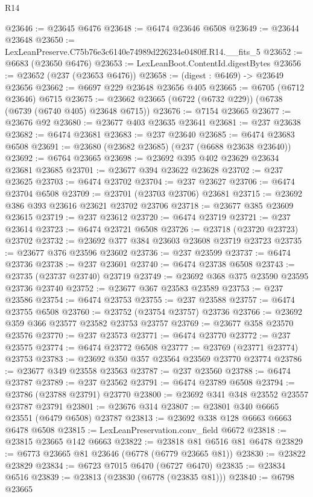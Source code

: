 \begin{lexlean}{R14}
\begin{coremodule}
@23646 := @23645 @6476
@23648 := @6474 @23646 @6508
@23649 := @23644 @23648
@23650 := LexLeanPreserve.C75b76e3c6140e74989d226234e0480ff.R14.__fits_5
@23652 := @6683 (@23650 @6476)
@23653 := LexLeanBoot.ContentId.digestBytes
@23656 := @23652 (@237 (@23653 @6476))
@23658 := (digest : @6469) -> @23649 @23656
@23662 := @6697 @229 @23648 @23656 @405
@23665 := @6705 (@6712 @23646) @6715
@23675 := @23662 @23665 (@6722 (@6732 @229)) (@6738 (@6739 (@6740 @405) @23648 @6715))
@23676 := @7154 @23665
@23677 := @23676 @92
@23680 := @23677 @403 @23635 @23641
@23681 := @237 @23638
@23682 := @6474 @23681
@23683 := @237 @23640
@23685 := @6474 @23683 @6508
@23691 := @23680 (@23682 @23685) (@237 (@6688 @23638 @23640))
@23692 := @6764 @23665
@23698 := @23692 @395 @402 @23629 @23634 @23681 @23685
@23701 := @23677 @394 @23622 @23628
@23702 := @237 @23625
@23703 := @6474 @23702
@23704 := @237 @23627
@23706 := @6474 @23704 @6508
@23709 := @23701 (@23703 @23706) @23681
@23715 := @23692 @386 @393 @23616 @23621 @23702 @23706
@23718 := @23677 @385 @23609 @23615
@23719 := @237 @23612
@23720 := @6474 @23719
@23721 := @237 @23614
@23723 := @6474 @23721 @6508
@23726 := @23718 (@23720 @23723) @23702
@23732 := @23692 @377 @384 @23603 @23608 @23719 @23723
@23735 := @23677 @376 @23596 @23602
@23736 := @237 @23599
@23737 := @6474 @23736
@23738 := @237 @23601
@23740 := @6474 @23738 @6508
@23743 := @23735 (@23737 @23740) @23719
@23749 := @23692 @368 @375 @23590 @23595 @23736 @23740
@23752 := @23677 @367 @23583 @23589
@23753 := @237 @23586
@23754 := @6474 @23753
@23755 := @237 @23588
@23757 := @6474 @23755 @6508
@23760 := @23752 (@23754 @23757) @23736
@23766 := @23692 @359 @366 @23577 @23582 @23753 @23757
@23769 := @23677 @358 @23570 @23576
@23770 := @237 @23573
@23771 := @6474 @23770
@23772 := @237 @23575
@23774 := @6474 @23772 @6508
@23777 := @23769 (@23771 @23774) @23753
@23783 := @23692 @350 @357 @23564 @23569 @23770 @23774
@23786 := @23677 @349 @23558 @23563
@23787 := @237 @23560
@23788 := @6474 @23787
@23789 := @237 @23562
@23791 := @6474 @23789 @6508
@23794 := @23786 (@23788 @23791) @23770
@23800 := @23692 @341 @348 @23552 @23557 @23787 @23791
@23801 := @23676 @314
@23807 := @23801 @340 @6665 @23551 (@6479 @6508) @23787
@23813 := @23692 @338 @128 @6663 @6663 @6478 @6508
@23815 := LexLeanPreservation.conv_field @6672
@23818 := @23815 @23665 @142 @6663
@23822 := @23818 @81 @6516 @81 @6478
@23829 := @6773 @23665 @81 @23646 (@6778 (@6779 @23665 @81))
@23830 := @23822 @23829
@23834 := @6723 @7015 @6470 (@6727 @6470)
@23835 := @23834 @6516
@23839 := @23813 (@23830 (@6778 (@23835 @81)))
@23840 := @6798 @23665

\end{coremodule}
\end{lexlean}
